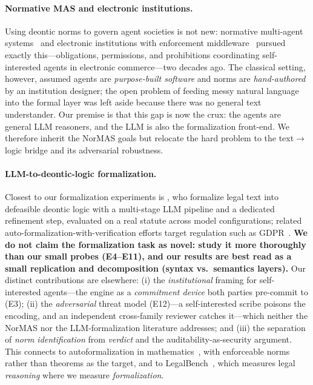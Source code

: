 \documentclass[11pt]{article}
\begin{document}
\paragraph{Normative MAS and electronic institutions.} Using deontic norms to govern agent
societies is not new: normative multi-agent systems~\citep{boella2006normative} and electronic
institutions with enforcement middleware~\citep{esteva2004ameli} pursued exactly this---obligations,
permissions, and prohibitions coordinating self-interested agents in electronic commerce---two
decades ago. The classical setting, however, assumed agents are \emph{purpose-built software} and
norms are \emph{hand-authored} by an institution designer; the open problem of feeding messy
natural language into the formal layer was left aside because there was no general text understander.
Our premise is that this gap is now the crux: the agents are general LLM reasoners, and the LLM is
also the formalization front-end. We therefore inherit the NorMAS goals but relocate the hard
problem to the text$\rightarrow$logic bridge and its adversarial robustness.

\paragraph{LLM-to-deontic-logic formalization.} Closest to our formalization experiments is
\citet{horner2025robust}, who formalize legal text into defeasible deontic logic with a multi-stage
LLM pipeline and a dedicated refinement step, evaluated on a real statute across model
configurations; related auto-formalization-with-verification efforts target regulation such as
GDPR~\citep{nguyen2026gdpr}. \textbf{We do not claim the formalization task as novel: \citet{horner2025robust}
study it more thoroughly than our small probes (E4--E11), and our results are best read as a
small replication and decomposition (syntax vs.\ semantics layers).} Our distinct contributions are
elsewhere: (i) the \emph{institutional} framing for self-interested agents---the engine as a
\emph{commitment device} both parties pre-commit to (E3); (ii) the \emph{adversarial} threat model
(E12)---a self-interested scribe poisons the encoding, and an independent cross-family reviewer
catches it---which neither the NorMAS nor the LLM-formalization literature addresses; and (iii) the
separation of \emph{norm identification} from \emph{verdict} and the auditability-as-security
argument. This connects to autoformalization in mathematics~\citep{wu2022autoformalization}, with
enforceable norms rather than theorems as the target, and to LegalBench~\citep{guha2023legalbench},
which measures legal \emph{reasoning} where we measure \emph{formalization}.
\end{document}
